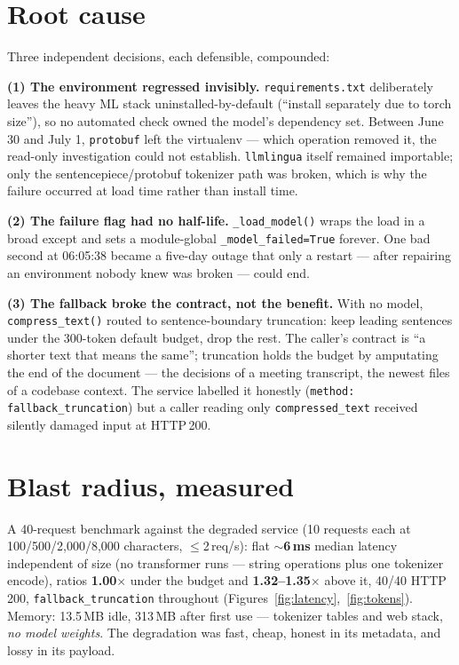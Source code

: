 \documentclass[10pt]{article}
\begin{document}
\section{Root cause}
\label{sec:rootcause}

Three independent decisions, each defensible, compounded:

\textbf{(1) The environment regressed invisibly.} \texttt{requirements.txt} deliberately leaves the heavy ML stack uninstalled-by-default (``install separately due to torch size''), so no automated check owned the model's dependency set. Between June 30 and July 1, \texttt{protobuf} left the virtualenv --- which operation removed it, the read-only investigation could not establish. \texttt{llmlingua} itself remained importable; only the sentencepiece/protobuf tokenizer path was broken, which is why the failure occurred at load time rather than install time.

\textbf{(2) The failure flag had no half-life.} \texttt{\_load\_model()} wraps the load in a broad except and sets a module-global \texttt{\_model\_failed=True} forever. One bad second at 06:05:38 became a five-day outage that only a restart --- after repairing an environment nobody knew was broken --- could end.

\textbf{(3) The fallback broke the contract, not the benefit.} With no model, \texttt{compress\_text()} routed to sentence-boundary truncation: keep leading sentences under the 300-token default budget, drop the rest. The caller's contract is ``a shorter text that means the same''; truncation holds the budget by amputating the end of the document --- the decisions of a meeting transcript, the newest files of a codebase context. The service labelled it honestly (\texttt{method: fallback\_truncation}) but a caller reading only \texttt{compressed\_text} received silently damaged input at HTTP\,200.

\section{Blast radius, measured}
\label{sec:blast}

A 40-request benchmark against the degraded service (10 requests each at 100/500/2{,}000/8{,}000 characters, $\leq$2\,req/s): flat \textbf{$\sim$6\,ms} median latency independent of size (no transformer runs --- string operations plus one tokenizer encode), ratios \textbf{1.00$\times$} under the budget and \textbf{1.32--1.35$\times$} above it, 40/40 HTTP\,200, \texttt{fallback\_truncation} throughout (Figures~\ref{fig:latency},~\ref{fig:tokens}). Memory: 13.5\,MB idle, 313\,MB after first use --- tokenizer tables and web stack, \emph{no model weights}. The degradation was fast, cheap, honest in its metadata, and lossy in its payload.
\end{document}
